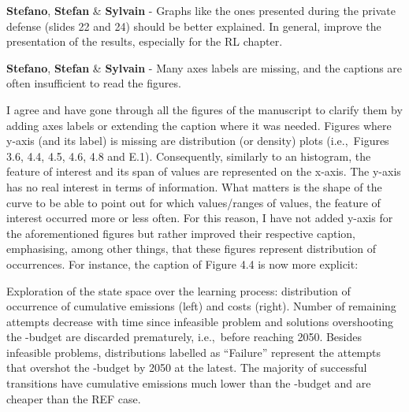 \documentclass[12pt,a4paper]{article}
\def\ie{i.e.,\ }
\begin{document}
\begin{mdframed}[style=comment] %
{\color{orange} \textbf{Stefano}}, {\color{teal} \textbf{Stefan}} \& {\color{purple} \textbf{Sylvain}} - Graphs like the ones presented during the private defense (slides 22 and 24) should be better explained. In general, improve the presentation of the results, especially for the RL chapter.
\end{mdframed}

\noindent 

\begin{mdframed}[style=manuscript] %

\end{mdframed}

\begin{mdframed}[style=comment] %
{\color{orange} \textbf{Stefano}}, {\color{teal} \textbf{Stefan}} \& {\color{purple} \textbf{Sylvain}} - Many axes labels are missing, and the captions are often insufficient to read the figures. 
\end{mdframed}

\noindent I agree and have gone through all the figures of the manuscript to clarify them by adding axes labels or extending the caption where it was needed. Figures where y-axis (and its label) is missing are distribution (or density) plots (\ie Figures 3.6, 4.4, 4.5, 4.6, 4.8 and E.1).  Consequently, similarly to an histogram, the feature of interest and its span of values are represented on the x-axis. The y-axis has no real interest in terms of information. What matters is the shape of the curve to be able to point out for which values/ranges of values, the feature of interest occurred more or less often.  For this reason, I have not added y-axis for the aforementioned figures but rather improved their respective caption, emphasising, among other things, that these figures represent distribution of occurrences. For instance, the caption of {\color{blue}Figure 4.4} is now more explicit:

\begin{mdframed}[style=manuscript] %
Exploration of the state space over the learning process: distribution of occurrence of cumulative emissions (left) and costs (right). Number of remaining attempts decrease with time since infeasible problem and solutions overshooting the -budget are discarded prematurely, \ie before reaching 2050. Besides infeasible problems, distributions labelled as ``Failure'' represent the attempts that overshot the -budget by 2050 at the latest. The majority of successful transitions have cumulative emissions much lower than the -budget and are cheaper than the REF case. 
\end{mdframed}
\end{document}
